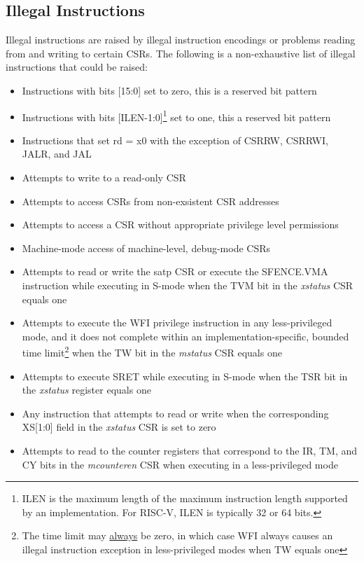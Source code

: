 \documentclass[12pt]{article}
\begin{document}
\subsection{Illegal Instructions}
Illegal instructions are raised by illegal instruction encodings or problems reading from and writing to certain CSRs. The following is a non-exhaustive list of illegal instructions that could be raised:
\begin{itemize}
    \item Instructions with bits [15:0] set to zero, this is a reserved bit pattern
    \item Instructions with bits [ILEN-1:0]\footnote[2]{ILEN is the maximum length of the maximum instruction length supported by an implementation. For RISC-V, ILEN is typically 32 or 64 bits.} set to one, this a reserved bit pattern 
    \item Instructions that set rd = x0 with the exception of CSRRW, CSRRWI, JALR, and JAL
    \item Attempts to write to a read-only CSR 
    \item Attempts to access CSRs from non-exsistent CSR addresses
    \item Attempts to access a CSR without appropriate privilege level permissions 
    \item Machine-mode access of machine-level, debug-mode CSRs
    \item Attempts to read or write the satp CSR or execute the SFENCE.VMA instruction while executing in S-mode when the TVM bit in the \emph{xstatus} CSR equals one
    \item Attempts to execute the WFI privilege instruction in any less-privileged mode, and it does not complete within an implementation-specific, bounded time limit\footnote[3]{The time limit may \underline{always} be zero, in which case WFI always causes an illegal instruction exception in less-privileged modes when TW equals one} when the TW bit in the \emph{mstatus} CSR equals one
    \item Attempts to execute SRET while executing in S-mode when the TSR bit in the \emph{xstatus} register equals one
    \item Any instruction that attempts to read or write when the corresponding XS[1:0] field in the \emph{xstatus} CSR is set to zero
    \item Attempts to read to the counter registers that correspond to the IR, TM, and CY bits in the \emph{mcounteren} CSR when executing in a less-privileged mode 
\end{itemize}
\end{document}
